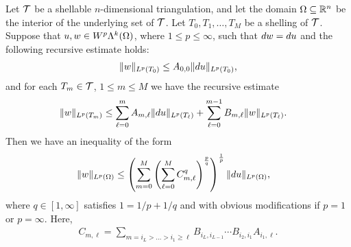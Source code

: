 \documentclass[10pt,a4paper]{article}
\begin{document}
\begin{theorem}\label{theorem:fullrecursivesum:exterior}
    Let ${\mathcal T}$ be a shellable $n$-dimensional triangulation, and let the domain $\Omega \subseteq {\mathbb R}^{n}$ be the interior of the underlying set of ${\mathcal T}$.
    Let $T_0, T_1, \dots, T_M$ be a shelling of ${\mathcal T}$.
    Suppose that $u, w \in W^{p}\Lambda^{k}(\Omega)$, where $1 \leq p \leq \infty$, 
    such that $d w = d u$ and the following recursive estimate holds:
    \begin{gather*}
        \| w \|_{L^{p}(T_{0})} 
        \leq 
        A_{0,0}
        \| d u \|_{L^{p}(T_{0})}
        ,
    \end{gather*}
    and for each $T_{m} \in {\mathcal T}$, $1 \leq m \leq M$ we have the recursive estimate 
    \begin{align*}
        \| w \|_{L^{p}(T_{m})}
        &
        \leq  
        \sum_{\ell=0}^{m} A_{m,\ell} \| d u \|_{L^{p}(T_{\ell})} 
        +
        \sum_{\ell=0}^{m-1} B_{m,\ell} \| w \|_{L^{p}(T_{\ell})} 
        .
    \end{align*}
    Then we have an inequality of the form 
    \begin{align*}
        \| w \|_{L^{p}(\Omega)}
        &
        \leq 
        \left(
            \sum_{m=0}^{M}
            \left( \sum_{\ell=0}^{M} C_{m,\ell}^{q} \right)^{\frac p q}
        \right)^{\frac 1 p}
        \| d u \|_{L^{p}(\Omega)}
        ,
    \end{align*}
    where $q \in [1,\infty]$ satisfies $1 = 1/p + 1/q$ and with obvious modifications if $p=1$ or $p=\infty$. 
    Here, 
    \begin{align*}
        C_{m,\ell} = \sum_{ m = i_L > \dots > i_1 \geq \ell } B_{i_{L},i_{L-1}} \cdots B_{i_{2},i_{1}} A_{i_{1},\ell}.
    \end{align*}
\end{theorem}
\end{document}
